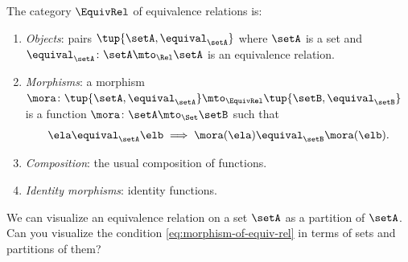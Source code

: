 \begin{ctdefinition}
    \label{def:cat-equivalence-relations}
    The category $\EquivRel$ of equivalence relations is:
    \begin{enumerate}
        \item \emph{Objects}: pairs $\tup{\setA, \equival_{\setA}}$ where $\setA$ is a set and $\equival_{\setA} \colon \setA \mto_{\Rel} \setA$ is an equivalence relation.
        \item \emph{Morphisms}: a morphism $\mora \colon \tup{\setA, \equival_{\setA}} \mto_{\EquivRel} \tup{\setB, \equival_{\setB}}$ is a function $\mora \colon \setA \mto_{\Set} \setB$ such that
              \begin{equation}\label{eq:morphism-of-equiv-rel}
                  \ela \equival_\setA \elb \implies \mora(\ela) \equival_\setB \mora(\elb).
              \end{equation}
        \item \emph{Composition}: the usual composition of functions.
        \item \emph{Identity morphisms}: identity functions.
    \end{enumerate}
\end{ctdefinition}

\begin{exercise}
    We can visualize an equivalence relation on a set $\setA$ as a partition of $\setA$.
    Can you visualize the condition \cref{eq:morphism-of-equiv-rel} in terms of sets and partitions of them?
\end{exercise}

\begin{solution}
\end{solution}
